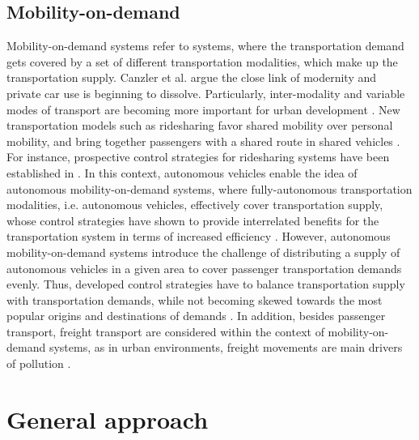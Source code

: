 \documentclass[a4paper,twoside]{article}
\begin{document}
	\subsection{Mobility-on-demand}
\label{sec:mobility-on-demand-systems}
	Mobility-on-demand systems refer to systems, where the transportation demand gets covered by a set of different transportation modalities, which make up the transportation supply.
	Canzler et al. \cite{canzler2016mobility} argue the close link of modernity and private car use is beginning to dissolve. Particularly, inter-modality and variable modes of transport are becoming more important for urban development \cite{rode2015towards}. New transportation models such as ridesharing favor shared mobility over personal mobility, and bring together passengers with a shared route in shared vehicles \cite{cohen2014ride}. For instance, prospective control strategies for ridesharing systems have been established in \cite{furuhata2013ridesharing,agatz2012optimization}.
	 In this context, autonomous vehicles enable the idea of autonomous mobility-on-demand systems, where fully-autonomous transportation modalities, i.e. autonomous vehicles, effectively cover transportation supply, whose control strategies have shown to provide interrelated benefits for the transportation system in terms of increased efficiency \cite{fagnant2014travel}. However, autonomous mobility-on-demand systems introduce the challenge of distributing a supply of autonomous vehicles in a given area to cover passenger transportation demands evenly. Thus, developed control strategies have to balance transportation supply with transportation demands, while not becoming skewed towards the most popular origins and destinations of demands \cite{pavone2012robotic,zhang2016control}. In addition, besides passenger transport, freight transport are considered within the context of mobility-on-demand systems, as in urban environments, freight movements are main drivers of pollution  \cite{amaral2015city}. %
	
	\section{General approach}
	\label{sec:approach}
	
\end{document}
